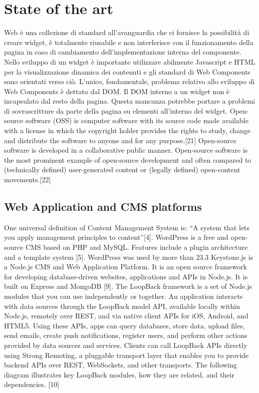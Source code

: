 \documentclass{sig-alternate}
\begin{document}
\section{State of the art}

Web  è una collezione di standard all'avanguardia che ci fornisce la possibilità di creare widget, è totalmente riusabile e non interferisce con il funzionamento della pagina in caso di cambiamento dell'implementazione interna del componente.
Nello sviluppo di un widget è importante utilizzare abilmente Javascript e HTML per la visualizzazione dinamica dei contenuti e gli standard di Web Components sono orientati verso ciò. L'unico, fondamentale, problema relativo allo sviluppo di Web Components è dettato dal DOM. Il DOM interno a un widget non è incapsulato dal resto della pagina. Questa mancanza potrebbe portare a problemi di sovrascritture da parte della pagina su elementi all'interno del widget.
Open-source software (OSS) is computer software with its source code made available with a license in which the copyright holder provides the rights to study, change and distribute the software to anyone and for any purpose.[21] Open-source software is developed in a collaborative public manner. Open-source software is the most prominent example of open-source development and often compared to (technically defined) user-generated content or (legally defined) open-content movements.[22]

\subsection{Web Application and CMS platforms}

One universal definition of Content Management System is: ``A system that lets you apply management principles to content''[4].
WordPress is a free and open-source CMS based on PHP and MySQL. Features include a plugin architecture and a template system [5]. WordPress was used by more than 23.3%
Keystone.js is a Node.js CMS and Web Application Platform. It is an open source framework for developing database-driven websites, applications and APIs in Node.js. It is built on Express and MongoDB [9].
The LoopBack framework is a set of Node.js modules that you can use independently or together.  
An application interacts with data sources through the LoopBack model API, available locally within Node.js, remotely over REST, and via native client APIs for iOS, Android, and HTML5. Using these APIs, apps can query databases, store data, upload files, send emails, create push notifications, register users, and perform other actions provided by data sources and services.
Clients can call LoopBack APIs directly using Strong Remoting, a pluggable transport layer that enables you to provide backend APIs over REST, WebSockets, and other transports.
The following diagram illustrates key LoopBack modules, how they are related, and their dependencies. [10]
\end{document}
